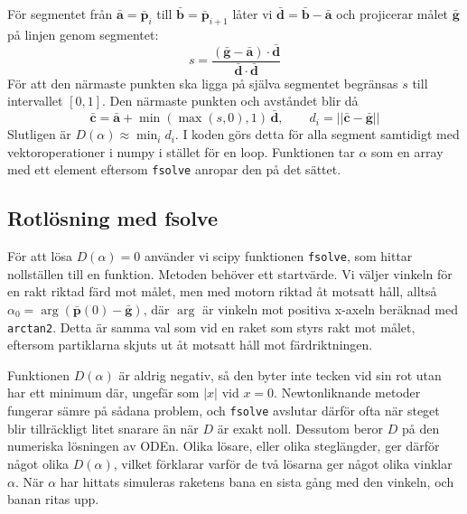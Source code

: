 \documentclass{article}
\newcommand{\bfbar}[1]{\ensuremath{\mathbf{\bar{#1}}}}
\begin{document}
För segmentet från \(\bfbar{a}=\bfbar{p}_i\) till \(\bfbar{b}=\bfbar{p}_{i+1}\) låter vi \(\bfbar{d}=\bfbar{b}-\bfbar{a}\) och projicerar målet \(\bfbar{g}\) på linjen genom segmentet:
\[
    s = \frac{(\bfbar{g}-\bfbar{a})\cdot \bfbar{d}}{\bfbar{d}\cdot \bfbar{d}}
\]
För att den närmaste punkten ska ligga på själva segmentet begränsas \(s\) till intervallet \([0,1]\).
Den närmaste punkten och avståndet blir då
\[
    \bfbar{c} = \bfbar{a} + \min(\max(s,0),1)\,\bfbar{d}, \qquad d_i = ||\bfbar{c}-\bfbar{g}||
\]
Slutligen är \(D(\alpha)\approx\min_i d_i\).
I koden görs detta för alla segment samtidigt med vektoroperationer i numpy i stället för en loop.
Funktionen tar \(\alpha\) som en array med ett element eftersom \texttt{fsolve} anropar den på det sättet.

\subsection{Rotlösning med fsolve}
För att lösa \(D(\alpha)=0\) använder vi scipy funktionen \texttt{fsolve}, som hittar nollställen till en funktion.
Metoden behöver ett startvärde.
Vi väljer vinkeln för en rakt riktad färd mot målet, men med motorn riktad åt motsatt håll, alltså \(\alpha_0=\arg(\bfbar{p}(0)-\bfbar{g})\), där \(\arg\) är vinkeln mot positiva x-axeln beräknad med \texttt{arctan2}.
Detta är samma val som vid en raket som styrs rakt mot målet, eftersom partiklarna skjuts ut åt motsatt håll mot färdriktningen.

Funktionen \(D(\alpha)\) är aldrig negativ, så den byter inte tecken vid sin rot utan har ett minimum där, ungefär som \(|x|\) vid \(x=0\).
Newtonliknande metoder fungerar sämre på sådana problem, och \texttt{fsolve} avslutar därför ofta när steget blir tillräckligt litet snarare än när \(D\) är exakt noll.
Dessutom beror \(D\) på den numeriska lösningen av ODEn.
Olika lösare, eller olika steglängder, ger därför något olika \(D(\alpha)\), vilket förklarar varför de två lösarna ger något olika vinklar \(\alpha\). När \(\alpha\) har hittats simuleras raketens bana en sista gång med den vinkeln, och banan ritas upp.
\end{document}

